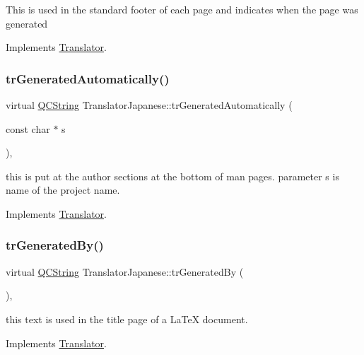 This is used in the standard footer of each page and indicates when the page was generated 

Implements \mbox{\hyperlink{class_translator}{Translator}}.

\mbox{\label{class_translator_japanese_a45c56599d692308b483171ad4e5e6585}} 
\subsubsection{\texorpdfstring{trGeneratedAutomatically()}{trGeneratedAutomatically()}}
{\footnotesize\ttfamily virtual \mbox{\hyperlink{class_q_c_string}{Q\+C\+String}} Translator\+Japanese\+::tr\+Generated\+Automatically (\begin{DoxyParamCaption}\item[{const char $\ast$}]{s }\end{DoxyParamCaption})\hspace{0.3cm}{\ttfamily [inline]}, {\ttfamily [virtual]}}

this is put at the author sections at the bottom of man pages. parameter s is name of the project name. 

Implements \mbox{\hyperlink{class_translator}{Translator}}.

\mbox{\label{class_translator_japanese_ab91e98e794a42802f4d9058c80a64478}} 
\subsubsection{\texorpdfstring{trGeneratedBy()}{trGeneratedBy()}}
{\footnotesize\ttfamily virtual \mbox{\hyperlink{class_q_c_string}{Q\+C\+String}} Translator\+Japanese\+::tr\+Generated\+By (\begin{DoxyParamCaption}{ }\end{DoxyParamCaption})\hspace{0.3cm}{\ttfamily [inline]}, {\ttfamily [virtual]}}

this text is used in the title page of a La\+TeX document. 

Implements \mbox{\hyperlink{class_translator}{Translator}}.

